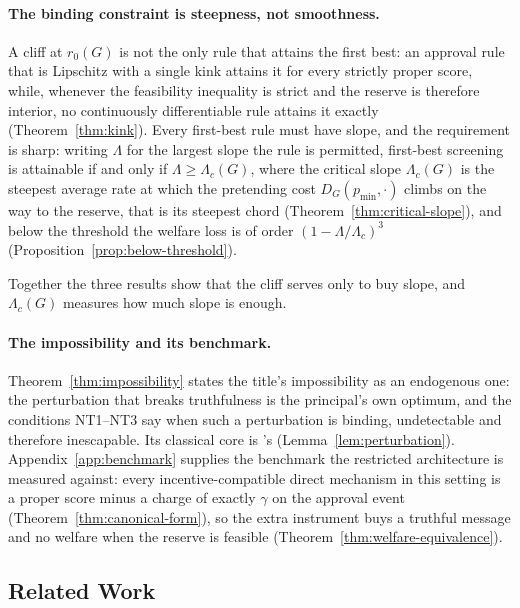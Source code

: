 \documentclass[acmsmall,nonacm,screen]{acmart}
\theoremstyle{acmplain}%
\theoremstyle{acmdefinition}%
\numberwithin{equation}{section}
\begin{document}
\paragraph{The binding constraint is steepness, not smoothness.} A cliff at $r_0(G)$ is not the only rule that attains the first best: an approval rule that is Lipschitz with a single kink attains it for every strictly proper score, while, whenever the feasibility inequality is strict and the reserve is therefore interior, no continuously differentiable rule attains it exactly (Theorem~\ref{thm:kink}). Every first-best rule must have slope, and the requirement is sharp: writing $\Lambda$ for the largest slope the rule is permitted, first-best screening is attainable if and only if $\Lambda \geq \Lambda_c(G)$, where the critical slope $\Lambda_c(G)$ is the steepest average rate at which the pretending cost $D_G(p_{\min}, \cdot)$ climbs on the way to the reserve, that is its steepest chord (Theorem~\ref{thm:critical-slope}), and below the threshold the welfare loss is of order $(1 - \Lambda/\Lambda_c)^3$ (Proposition~\ref{prop:below-threshold}).

Together the three results show that the cliff serves only to buy slope, and $\Lambda_c(G)$ measures how much slope is enough.

\paragraph{The impossibility and its benchmark.} Theorem~\ref{thm:impossibility} states the title's impossibility as an endogenous one: the perturbation that breaks truthfulness is the principal's own optimum, and the conditions NT1--NT3 say when such a perturbation is binding, undetectable and therefore inescapable. Its classical core is \citet{boutilier2012eliciting}'s (Lemma~\ref{lem:perturbation}). Appendix~\ref{app:benchmark} supplies the benchmark the restricted architecture is measured against: every incentive-compatible direct mechanism in this setting is a proper score minus a charge of exactly $\gamma$ on the approval event (Theorem~\ref{thm:canonical-form}), so the extra instrument buys a truthful message and no welfare when the reserve is feasible (Theorem~\ref{thm:welfare-equivalence}).

\subsection{Related Work}
\label{sec:related}
\end{document}
